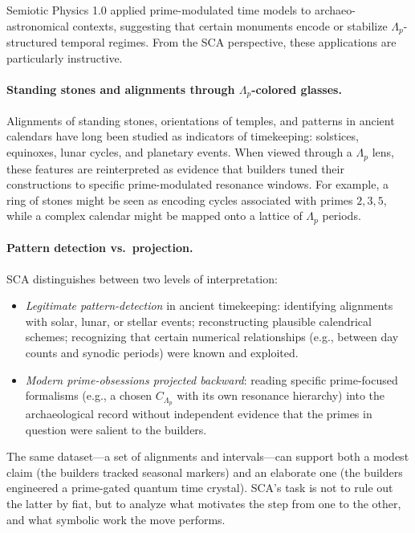 \documentclass[12]{amsart}
\theoremstyle{plain}
\begin{document}
Semiotic Physics 1.0 applied prime-modulated time models to archaeo-astronomical contexts, suggesting that certain monuments encode or stabilize $\Lambda_p$-structured temporal regimes. From the SCA perspective, these applications are particularly instructive.

\paragraph{Standing stones and alignments through $\Lambda_p$-colored glasses.} Alignments of standing stones, orientations of temples, and patterns in ancient calendars have long been studied as indicators of timekeeping: solstices, equinoxes, lunar cycles, and planetary events. When viewed through a $\Lambda_p$ lens, these features are reinterpreted as evidence that builders tuned their constructions to specific prime-modulated resonance windows. For example, a ring of stones might be seen as encoding cycles associated with primes $2,3,5$, while a complex calendar might be mapped onto a lattice of $\Lambda_p$ periods.

\paragraph{Pattern detection vs.\ projection.} SCA distinguishes between two levels of interpretation:

\begin{itemize}
  \item \emph{Legitimate pattern-detection} in ancient timekeeping: identifying alignments with solar, lunar, or stellar events; reconstructing plausible calendrical schemes; recognizing that certain numerical relationships (e.g., between day counts and synodic periods) were known and exploited.
  \item \emph{Modern prime-obsessions projected backward}: reading specific prime-focused formalisms (e.g., a chosen $C_{\Lambda_p}$ with its own resonance hierarchy) into the archaeological record without independent evidence that the primes in question were salient to the builders.
\end{itemize}

The same dataset—a set of alignments and intervals—can support both a modest claim (the builders tracked seasonal markers) and an elaborate one (the builders engineered a prime-gated quantum time crystal). SCA's task is not to rule out the latter by fiat, but to analyze what motivates the step from one to the other, and what symbolic work the move performs.
\end{document}
